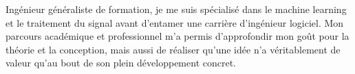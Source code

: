 

\begin{cvparagraph}
	Ingénieur généraliste de formation, je me suis spécialisé dans le machine learning et le traitement du signal avant d'entamer une carrière d'ingénieur logiciel. Mon parcours académique et professionnel m'a permis d'approfondir mon goût pour la théorie et la conception, mais aussi de réaliser qu'une idée n'a véritablement de valeur qu'au bout de son plein développement concret.
\end{cvparagraph}
